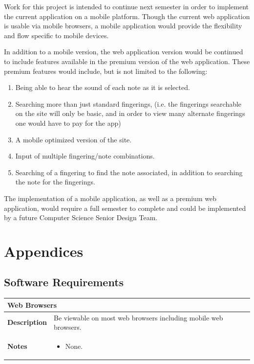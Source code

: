 \documentclass[12pt,english]{article}
\providecommand{\tabularnewline}{\\}
\begin{document}
Work for this project is intended to continue next semester in order
to implement the current application on a mobile platform. Though
the current web application is usable via mobile browsers, a mobile
application would provide the flexibility and flow specific to mobile
devices.

In addition to a mobile version, the web application version would
be continued to include features available in the premium version
of the web application. These premium features would include, but
is not limited to the following: 
\begin{enumerate}
\item Being able to hear the sound of each note as it is selected. 
\item Searching more than just standard fingerings, (i.e. the fingerings
searchable on the site will only be basic, and in order to view many
alternate fingerings one would have to pay for the app) 
\item A mobile optimized version of the site. 
\item Input of multiple fingering/note combinations. 
\item Searching of a fingering to find the note associated, in addition
to searching the note for the fingerings. 
\end{enumerate}
The implementation of a mobile application, as well as a premium web
application, would require a full semester to complete and could be
implemented by a future Computer Science Senior Design Team.


\section{Appendices}


\subsection{Software Requirements}

\begin{tabular}{|p{3cm}|p{13cm}|}
\hline 
\multicolumn{2}{|l|}{\textbf{Web Browsers}}\tabularnewline
\hline 
\textbf{Description}  & Be viewable on most web browsers including mobile web browsers. \tabularnewline
\hline 
\textbf{Notes}  & \begin{itemize}
\item None. \end{itemize}
\tabularnewline
\hline 
\end{tabular}\\[0.5cm]
\end{document}

